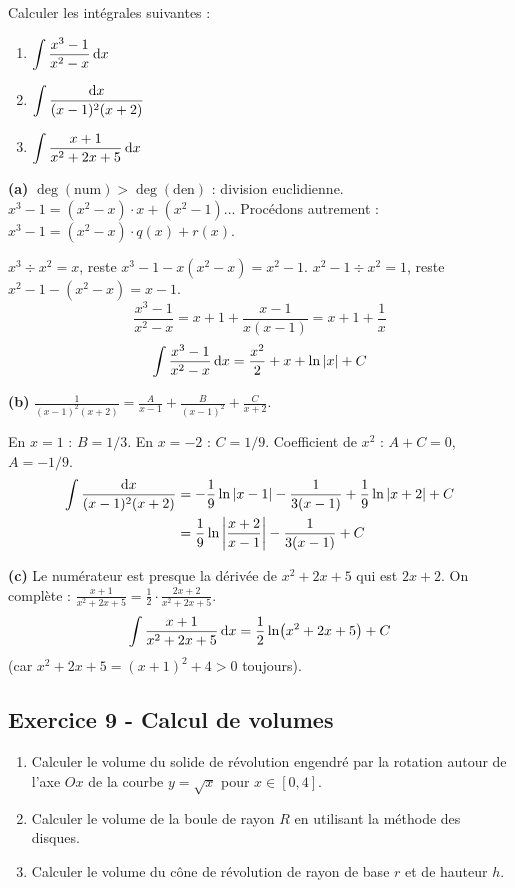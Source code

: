\documentclass[12pt,a4paper]{article}
\begin{document}
\begin{boiteexercice}
Calculer les intégrales suivantes :
\begin{enumerate}[label=(\alph*)]
  \item $\displaystyle\int\frac{x^3-1}{x^2-x}\,\mathrm{d} x$
  \item $\displaystyle\int\frac{\mathrm{d} x}{(x-1)^2(x+2)}$
  \item $\displaystyle\int\frac{x+1}{x^2+2x+5}\,\mathrm{d} x$
\end{enumerate}
\end{boiteexercice}

\begin{boitecorrige}
\textbf{(a)} $\deg(\text{num}) > \deg(\text{den})$ : division euclidienne. $x^3-1 = (x^2-x)\cdot x + (x^2-1)$... Procédons autrement : $x^3-1 = (x^2-x)\cdot q(x)+r(x)$.

$x^3\div x^2 = x$, reste $x^3-1-x(x^2-x) = x^2-1$. $x^2-1\div x^2 = 1$, reste $x^2-1-(x^2-x)=x-1$.
\[
\frac{x^3-1}{x^2-x} = x+1+\frac{x-1}{x(x-1)} = x+1+\frac{1}{x}
\]
\[
\int\frac{x^3-1}{x^2-x}\,\mathrm{d} x = \frac{x^2}{2}+x+\ln|x|+C
\]

\textbf{(b)} $\frac{1}{(x-1)^2(x+2)} = \frac{A}{x-1}+\frac{B}{(x-1)^2}+\frac{C}{x+2}$.

En $x=1$ : $B = 1/3$. En $x=-2$ : $C = 1/9$. Coefficient de $x^2$ : $A+C=0$, $A=-1/9$.
\begin{align*}
\int\frac{\mathrm{d} x}{(x-1)^2(x+2)} &= -\frac{1}{9}\ln|x-1|-\frac{1}{3(x-1)}+\frac{1}{9}\ln|x+2|+C\\
&= \frac{1}{9}\ln\left|\frac{x+2}{x-1}\right|-\frac{1}{3(x-1)}+C
\end{align*}

\textbf{(c)} Le numérateur est presque la dérivée de $x^2+2x+5$ qui est $2x+2$. On complète :
$\frac{x+1}{x^2+2x+5} = \frac{1}{2}\cdot\frac{2x+2}{x^2+2x+5}$.
\[
\int\frac{x+1}{x^2+2x+5}\,\mathrm{d} x = \frac{1}{2}\ln(x^2+2x+5)+C
\]
(car $x^2+2x+5 = (x+1)^2+4 > 0$ toujours).
\end{boitecorrige}

\subsection*{Exercice 9 - Calcul de volumes \niveau{\moyen}}

\begin{boiteexercice}
\begin{enumerate}
  \item Calculer le volume du solide de révolution engendré par la rotation autour de l'axe $Ox$ de la courbe $y=\sqrt{x}$ pour $x\in[0,4]$.
  \item Calculer le volume de la boule de rayon $R$ en utilisant la méthode des disques.
  \item Calculer le volume du cône de révolution de rayon de base $r$ et de hauteur $h$.
\end{enumerate}
\end{boiteexercice}
\end{document}
